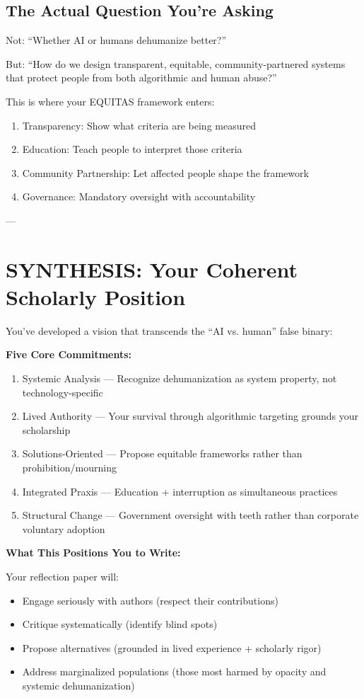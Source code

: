 \documentclass[12pt,letterpaper]{article}
\begin{document}
\subsection{The Actual Question You're Asking}

\begin{livedexperience}
Not: ``Whether AI or humans dehumanize better?''

But: ``How do we design transparent, equitable, community-partnered systems that protect people from both algorithmic and human abuse?''

This is where your EQUITAS framework enters:
\begin{enumerate}
\item Transparency: Show what criteria are being measured
\item Education: Teach people to interpret those criteria
\item Community Partnership: Let affected people shape the framework
\item Governance: Mandatory oversight with accountability
\end{enumerate}
\end{livedexperience}

---

\section{SYNTHESIS: Your Coherent Scholarly Position}

You've developed a vision that transcends the ``AI vs. human'' false binary:

\textbf{Five Core Commitments:}
\begin{enumerate}
\item Systemic Analysis --- Recognize dehumanization as system property, not technology-specific
\item Lived Authority --- Your survival through algorithmic targeting grounds your scholarship
\item Solutions-Oriented --- Propose equitable frameworks rather than prohibition/mourning
\item Integrated Praxis --- Education + interruption as simultaneous practices
\item Structural Change --- Government oversight with teeth rather than corporate voluntary adoption
\end{enumerate}

\textbf{What This Positions You to Write:}

Your reflection paper will:
\begin{itemize}
\item Engage seriously with authors (respect their contributions)
\item Critique systematically (identify blind spots)
\item Propose alternatives (grounded in lived experience + scholarly rigor)
\item Address marginalized populations (those most harmed by opacity and systemic dehumanization)
\end{itemize}
\end{document}
